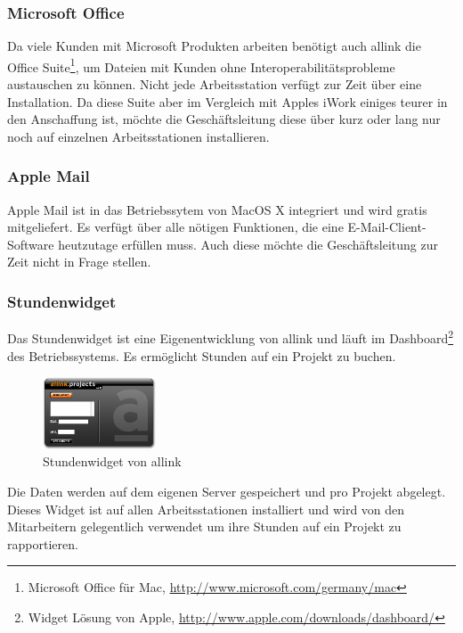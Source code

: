 \subsubsection{Microsoft Office}
Da viele Kunden mit Microsoft Produkten arbeiten benötigt auch allink die
Office Suite\footnote{Microsoft Office für Mac, \url{http://www.microsoft.com/germany/mac}}, 
um Dateien mit Kunden ohne Interoperabilitätsprobleme austauschen zu können. 
Nicht jede Arbeitsstation verfügt zur Zeit über eine Installation. Da diese
Suite aber im Vergleich mit Apples iWork einiges teurer in den Anschaffung ist,
möchte die Geschäftsleitung diese über kurz oder lang nur noch auf einzelnen
Arbeitsstationen installieren.

\subsubsection{Apple Mail}
Apple Mail ist in das Betriebssytem von MacOS X integriert und wird gratis
mitgeliefert. Es verfügt über alle nötigen Funktionen, die eine E-Mail-Client-Software
heutzutage erfüllen muss. Auch diese möchte die Geschäftsleitung zur Zeit nicht
in Frage stellen.

\subsubsection{Stundenwidget}
Das Stundenwidget ist eine Eigenentwicklung von allink und läuft
im Dashboard\footnote{Widget Lösung von Apple, \url{http://www.apple.com/downloads/dashboard/}}
des Betriebssystems. Es ermöglicht Stunden auf ein Projekt zu buchen.

\begin{figure}[htbp]
\begin{center}
\includegraphics[width=0.3\textwidth,angle=0]{./bilder/analyse/ist_widget.png}
\caption{Stundenwidget von allink}
\label{pic:ist_widget}
\end{center}
\end{figure}

Die Daten werden auf dem eigenen Server gespeichert und pro Projekt abgelegt. Dieses Widget ist auf allen
Arbeitsstationen installiert und wird von den Mitarbeitern gelegentlich verwendet
um ihre Stunden auf ein Projekt zu rapportieren.
